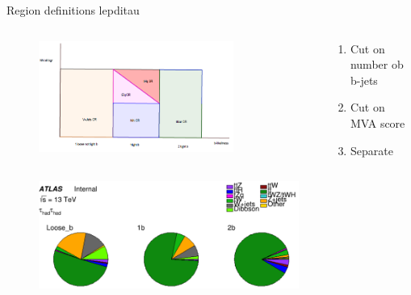 \begin{frame}{Region definitions lepditau}
    \begin{columns}
        \begin{column}{0.6\textwidth}
            \begin{figure}
                \centering
                \includegraphics[width=0.8\textwidth]{region_defs}
            \end{figure}
        \end{column}
        \begin{column}{0.4\textwidth}
            \begin{enumerate}
                \item Cut on number ob b-jets
                \item Cut on MVA score
                \item Separate \tZq
            \end{enumerate}
        \end{column}
    \end{columns}
    \begin{figure}
        \centering
        \includegraphics[width=0.76\textwidth]{hadhad_yield}
    \end{figure}
\end{frame}